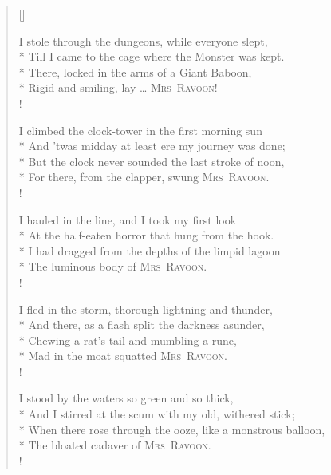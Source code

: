 \documentclass[11pt, a4paper]{article}
\newcommand{\ravoon}{\textsc{Mrs\ Ravoon}}
\newcommand{\poemauthor}[1]{\nopagebreak{\centering #1\par}}
\newenvironment{rverse*}{
\begin{patverse}
}{
\ignorespacesafterend
\end{patverse}
}
\begin{document}
\settowidth{\versewidth}{When there rose through the ooze, like a monstrous balloon,}
\poemauthor{Paul Dehn (1912--1979)}
\begin{verse}[\versewidth]

\begin{rverse*}
I stole through the dungeons, while everyone slept, \\*
Till I came to the cage where the Monster was kept. \\*
There, locked in the arms of a Giant Baboon, \\*
Rigid and smiling, lay \ldots{} \ravoon{}! \\!
\end{rverse*}

\begin{rverse*}
I climbed the clock-tower in the first morning sun \\*
And 'twas midday at least ere my journey was done; \\*
But the clock never sounded the last stroke of noon, \\*
For there, from the clapper, swung \ravoon{}. \\!
\end{rverse*}

\begin{rverse*}
I hauled in the line, and I took my first look \\*
At the half-eaten horror that hung from the hook. \\*
I had dragged from the depths of the limpid lagoon \\*
The luminous body of \ravoon{}. \\!
\end{rverse*}

\begin{rverse*}
I fled in the storm, thorough lightning and thunder, \\*
And there, as a flash split the darkness asunder, \\*
Chewing a rat's-tail and mumbling a rune, \\*
Mad in the moat squatted \ravoon{}. \\!
\end{rverse*}

\begin{rverse*}
I stood by the waters so green and so thick, \\*
And I stirred at the scum with my old, withered stick; \\*
When there rose through the ooze, like a monstrous balloon, \\*
The bloated cadaver of \ravoon{}. \\!
\end{rverse*}


\end{verse}
\end{document}
